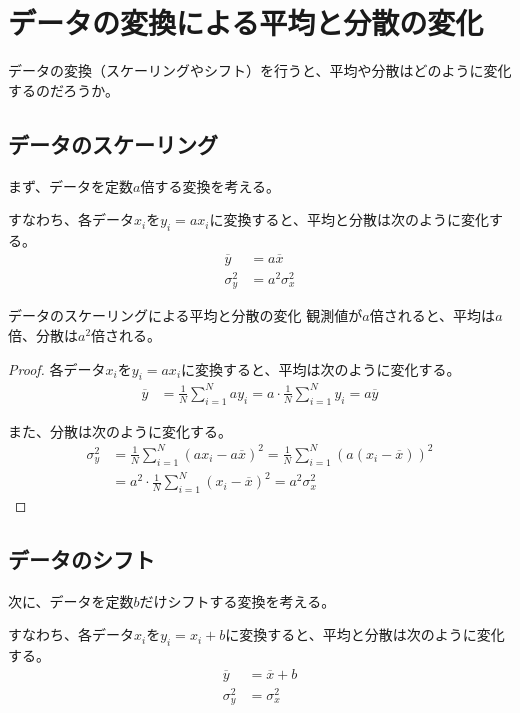 \documentclass[../../../topic_statistics]{subfiles}
\begin{document}
\sectionline
\section{データの変換による平均と分散の変化}

データの変換（スケーリングやシフト）を行うと、平均や分散はどのように変化するのだろうか。

\subsection{データのスケーリング}

まず、データを定数$a$倍する変換を考える。

すなわち、各データ$x_i$を$y_i = ax_i$に変換すると、平均と分散は次のように変化する。
\begin{align*}
  \overline{y} &= a \overline{x} \\
  \sigma_y^2 &= a^2 \sigma_x^2
\end{align*}

\begin{theorem}{データのスケーリングによる平均と分散の変化}
  観測値が$a$倍されると、平均は$a$倍、分散は$a^2$倍される。
\end{theorem}

\begin{proof}
  各データ$x_i$を$y_i = ax_i$に変換すると、平均は次のように変化する。
  \begin{align*}
    \overline{y} &= \frac{1}{N} \sum_{i=1}^{N} ay_i = a \cdot \frac{1}{N} \sum_{i=1}^{N} y_i = a \overline{y}
  \end{align*}

  また、分散は次のように変化する。
  \begin{align*}
    \sigma_y^2 &= \frac{1}{N} \sum_{i=1}^{N} (ax_i - a\overline{x})^2 = \frac{1}{N} \sum_{i=1}^N (a(x_i - \overline{x}))^2 \\
    &= a^2 \cdot \frac{1}{N} \sum_{i=1}^{N} (x_i - \overline{x})^2 = a^2 \sigma_x^2
  \end{align*}
\end{proof}

\subsection{データのシフト}

次に、データを定数$b$だけシフトする変換を考える。

すなわち、各データ$x_i$を$y_i = x_i + b$に変換すると、平均と分散は次のように変化する。
\begin{align*}
  \overline{y} &= \overline{x} + b \\
  \sigma_y^2 &= \sigma_x^2
\end{align*}
\end{document}
